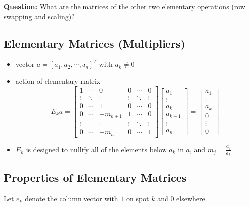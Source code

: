 \documentclass[11pt]{article}
\providecommand{\tightlist}{%
      \setlength{\itemsep}{0pt}\setlength{\parskip}{0pt}}
\begin{document}
\textbf{Question:} What are the matrices of the other two elementary
operations (row swapping and scaling)?

    \subsection{Elementary Matrices
(Multipliers)}\label{elementary-matrices-multipliers}

\begin{itemize}
\tightlist
\item
  vector \(a = [a_1, a_2, \cdots, a_n]^T\) with \(a_k\ne 0\)
\item
  action of elementary matrix \[E_k a=\left[\begin{array}{cccccc}
  1&\cdots&0&0&\cdots&0\\
  \vdots&\ddots&\vdots&\vdots&\ddots&\vdots\\
  0&\cdots&1&0&\cdots&0\\
  0&\cdots&{-m_{k+1}}&1&\cdots&0\\
  \vdots&&\vdots&\vdots&\ddots&\vdots\\
  0&\cdots&{-m_n}&0&\cdots&1
  \end{array}\right]\left[
  \begin{array}{c}a_1\\\vdots\\a_k\\a_{k+1}\\\vdots\\a_n\end{array}\right]
  =\left[\begin{array}{c}
  a_1\\\vdots\\a_k\\0\\\vdots\\0\end{array}\right]\]
\item
  \(E_k\) is designed to nullify all of the elements below \(a_k\) in
  \(a\), and \(m_j = \frac{a_j}{a_k}\)
\end{itemize}

    \subsection{Properties of Elementary
Matrices}\label{properties-of-elementary-matrices}

Let \(e_k\) denote the column vector with \(1\) on spot \(k\) and \(0\)
elsewhere.
\end{document}

